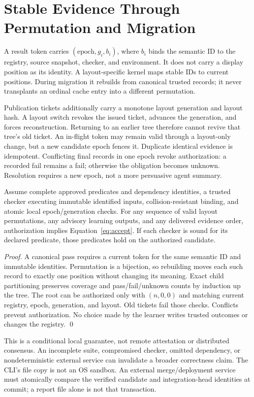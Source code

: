 \section{Stable Evidence Through Permutation and Migration}\label{sec:soundness}
A result token carries $(\text{epoch},g_i,b_i)$, where $b_i$ binds the semantic
ID to the registry, source snapshot, checker, and environment. It does not carry
a display position as its identity. A layout-specific kernel maps stable IDs to
current positions. During migration it rebuilds from canonical trusted records;
it never transplants an ordinal cache entry into a different permutation.

Publication tickets additionally carry a monotone layout generation and layout
hash. A layout switch revokes the issued ticket, advances the generation, and
forces reconstruction. Returning to an earlier tree therefore cannot revive that
tree's old ticket. An in-flight token may remain valid through a layout-only
change, but a new candidate epoch fences it. Duplicate identical evidence is
idempotent. Conflicting final records in one epoch revoke authorization: a
recorded fail remains a fail; otherwise the obligation becomes unknown.
Resolution requires a new epoch, not a more persuasive agent summary.

\begin{theorem}\label{thm:soundness}
Assume complete approved predicates and dependency identities, a trusted checker
executing immutable identified inputs, collision-resistant binding, and atomic
local epoch/generation checks. For any sequence of valid layout permutations,
any advisory learning outputs, and any delivered evidence order, authorization
implies Equation~\eqref{eq:accept}. If each checker is sound for its declared
predicate, those predicates hold on the authorized candidate.
\end{theorem}
\begin{proof}
A canonical pass requires a current token for the same semantic ID and immutable
identities. Permutation is a bijection, so rebuilding moves each such record to
exactly one position without changing its meaning. Exact child partitioning
preserves coverage and pass/fail/unknown counts by induction up the tree. The
root can be authorized only with $(n,0,0)$ and matching current registry, epoch,
generation, and layout. Old tickets fail those checks. Conflicts prevent
authorization. No choice made by the learner writes trusted outcomes or changes
the registry. \qed
\end{proof}
This is a conditional local guarantee, not remote attestation or distributed
consensus. An incomplete suite, compromised checker, omitted dependency, or
nondeterministic external service can invalidate a broader correctness claim. The
CLI's file copy is not an OS sandbox. An external merge/deployment service must
atomically compare the verified candidate and integration-head identities at
commit; a report file alone is not that transaction.

